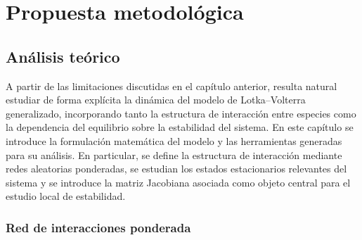 \chapter{Propuesta metodológica}

\section{Análisis teórico}

\setlength{\parindent}{0cm} A partir de las limitaciones discutidas en el capítulo anterior, resulta natural estudiar de forma explícita la dinámica del modelo de Lotka--Volterra generalizado, incorporando tanto la estructura de interacción entre especies como la dependencia del equilibrio sobre la estabilidad del sistema. En este capítulo se introduce la formulación matemática del modelo y las herramientas generadas para su análisis. En particular, se define la estructura de interacción mediante redes aleatorias ponderadas, se estudian los estados estacionarios relevantes del sistema y se introduce la matriz Jacobiana asociada como objeto central para el estudio local de estabilidad.

\subsection{Red de interacciones ponderada}

